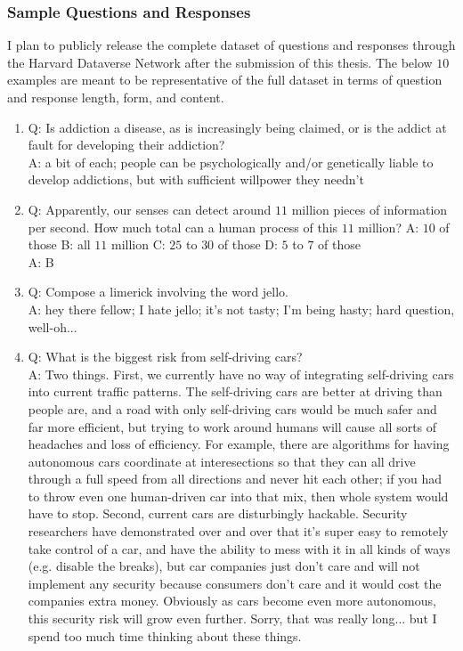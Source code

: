 \subsubsection{Sample Questions and Responses}

I plan to publicly release the complete dataset of questions and responses through the Harvard Dataverse Network after the submission of this thesis. The below $10$ examples are meant to be representative of the full dataset in terms of question and response length, form, and content.

\begin{enumerate}

\item Q: Is addiction a disease, as is increasingly being claimed, or is the addict at fault for developing their addiction?
\\ A: a bit of each; people can be psychologically and/or genetically liable to develop addictions, but with sufficient willpower they needn't

\item Q: Apparently, our senses can detect around $11$ million pieces of information per second. How much total can a human process of this $11$ million? A: $10$ of those B: all $11$ million C: $25$ to $30$ of those D: $5$ to $7$ of those
\\ A: B

\item Q: Compose a limerick involving the word jello.
\\ A: hey there fellow; I hate jello; it's not tasty; I'm being hasty; hard question, well-oh...

\item Q: What is the biggest risk from self-driving cars?
\\ A: Two things.  First, we currently have no way of integrating self-driving cars into current traffic patterns.  The self-driving cars are better at driving than people are, and a road with only self-driving cars would be much safer and far more efficient, but trying to work around humans will cause all sorts of headaches and loss of efficiency.  For example, there are algorithms for having autonomous cars coordinate at interesections so that they can all drive through a full speed from all directions and never hit each other; if you had to throw even one human-driven car into that mix, then whole system would have to stop.  Second, current cars are disturbingly hackable.  Security researchers have demonstrated over and over that it's super easy to remotely take control of a car, and have the ability to mess with it in all kinds of ways (e.g. disable the breaks), but car companies just don't care and will not implement any security because consumers don't care and it would cost the companies extra money.  Obviously as cars become even more autonomous, this security risk will grow even further.  Sorry, that was really long... but I spend too much time thinking about these things.


\end{enumerate}
